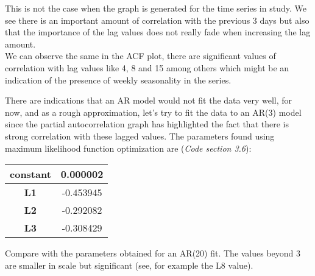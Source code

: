 \documentclass[11pt]{article}
\begin{document}
{This is not the case when the graph is generated for the time series in study. We see there is an important amount of correlation with the previous 3 days but also that the importance of the lag values does not really fade when increasing the lag amount.\\ 
We can observe the same in the ACF plot, there are significant values of correlation with lag values like 4, 8 and 15 among others which might be an indication of the presence of weekly seasonality in the series.

There are indications that an AR model would not fit the data very well, for now, and as a rough approximation, let's try to fit the data to an AR(3) model since the partial autocorrelation graph has highlighted the fact that there is strong correlation with these lagged values. The parameters found using maximum likelihood function optimization are (\textsl{Code section 3.6}):
\medskip

\begin{center}
	\centering
	\begin{tabular}{|c|c|}
		\hline 
		\textbf{constant}&0.000002\\ 
		\hline 
		\textbf{L1}&-0.453945  \\ 
		\hline 
		\textbf{L2}&-0.292082  \\ 
		\hline 
		\textbf{L3}&-0.308429  \\ 
		\hline 
	\end{tabular}
\end{center}

Compare with the parameters obtained for an AR(20) fit. The values beyond 3 are smaller in scale  but significant (see, for example the L8 value).
\medskip

}
\end{document}
